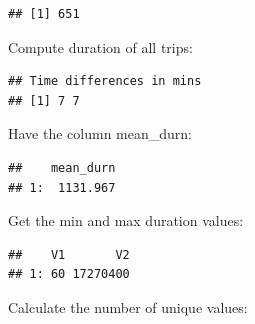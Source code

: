\documentclass[]{book}
\newenvironment{Shaded}{\begin{snugshade}}{\end{snugshade}}
\newcommand{\DataTypeTok}[1]{\textcolor[rgb]{0.13,0.29,0.53}{#1}}
\newcommand{\DecValTok}[1]{\textcolor[rgb]{0.00,0.00,0.81}{#1}}
\newcommand{\KeywordTok}[1]{\textcolor[rgb]{0.13,0.29,0.53}{\textbf{#1}}}
\newcommand{\NormalTok}[1]{#1}
\newcommand{\OperatorTok}[1]{\textcolor[rgb]{0.81,0.36,0.00}{\textbf{#1}}}
\newcommand{\StringTok}[1]{\textcolor[rgb]{0.31,0.60,0.02}{#1}}
\begin{document}
\begin{verbatim}
## [1] 651
\end{verbatim}

Compute duration of all trips:

\begin{Shaded}
\end{Shaded}

\begin{verbatim}
## Time differences in mins
## [1] 7 7
\end{verbatim}

Have the column mean\_durn:

\begin{Shaded}
\end{Shaded}

\begin{verbatim}
##    mean_durn
## 1:  1131.967
\end{verbatim}

Get the min and max duration values:

\begin{Shaded}
\end{Shaded}

\begin{verbatim}
##    V1       V2
## 1: 60 17270400
\end{verbatim}

Calculate the number of unique values:
\end{document}
